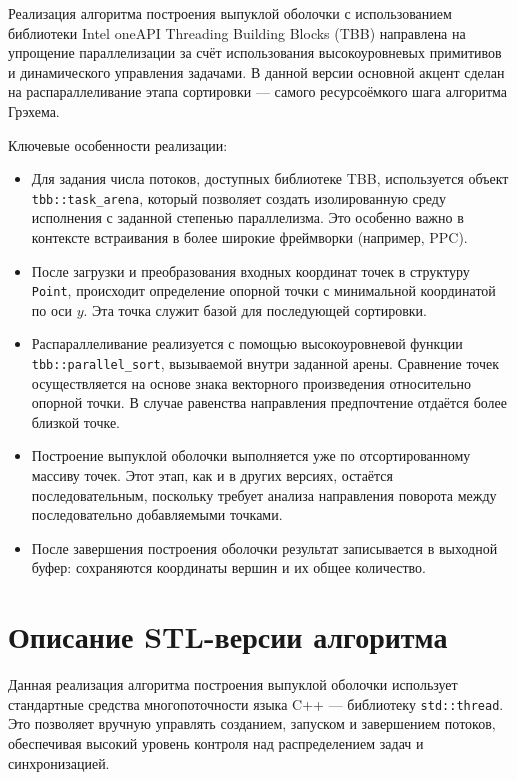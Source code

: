 \documentclass[12pt,a4paper]{extarticle}
\begin{document}
Реализация алгоритма построения выпуклой оболочки с использованием библиотеки Intel oneAPI Threading Building Blocks (TBB) направлена на упрощение параллелизации за счёт использования высокоуровневых примитивов и динамического управления задачами. В данной версии основной акцент сделан на распараллеливание этапа сортировки — самого ресурсоёмкого шага алгоритма Грэхема.

Ключевые особенности реализации:

\begin{itemize}
    \item Для задания числа потоков, доступных библиотеке TBB, используется объект \texttt{tbb::task\_arena}, который позволяет создать изолированную среду исполнения с заданной степенью параллелизма. Это особенно важно в контексте встраивания в более широкие фреймворки (например, PPC).

    \item После загрузки и преобразования входных координат точек в структуру \texttt{Point}, происходит определение опорной точки с минимальной координатой по оси $y$. Эта точка служит базой для последующей сортировки.

    \item Распараллеливание реализуется с помощью высокоуровневой функции \texttt{tbb::parallel\_sort}, вызываемой внутри заданной арены. Сравнение точек осуществляется на основе знака векторного произведения относительно опорной точки. В случае равенства направления предпочтение отдаётся более близкой точке.

    \item Построение выпуклой оболочки выполняется уже по отсортированному массиву точек. Этот этап, как и в других версиях, остаётся последовательным, поскольку требует анализа направления поворота между последовательно добавляемыми точками.

    \item После завершения построения оболочки результат записывается в выходной буфер: сохраняются координаты вершин и их общее количество.
\end{itemize}

\section{Описание STL-версии алгоритма}

Данная реализация алгоритма построения выпуклой оболочки использует стандартные средства многопоточности языка C++ — библиотеку \texttt{std::thread}. Это позволяет вручную управлять созданием, запуском и завершением потоков, обеспечивая высокий уровень контроля над распределением задач и синхронизацией.
\end{document}
